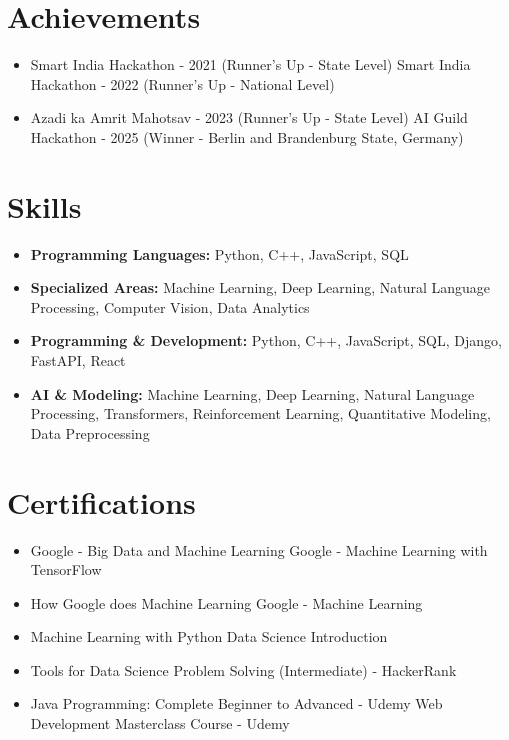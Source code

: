 \documentclass[a4paper,10pt]{article}
\begin{document}
\section*{Achievements}
\begin{itemize}
\item Smart India Hackathon - 2021 (Runner's Up - State Level) \hfill Smart India Hackathon - 2022 (Runner's Up - National Level)
\item Azadi ka Amrit Mahotsav - 2023 (Runner's Up - State Level) \hfill AI Guild Hackathon - 2025 (Winner - Berlin and Brandenburg State, Germany)
\end{itemize}

\section*{Skills}
\begin{itemize}
  \item \textbf{Programming Languages:} Python, C++, JavaScript, SQL
  \item \textbf{Specialized Areas:} Machine Learning, Deep Learning, Natural Language Processing, Computer Vision, Data Analytics
  \item \textbf{Programming \& Development:} Python, C++, JavaScript, SQL, Django, FastAPI, React
  \item \textbf{AI \& Modeling:} Machine Learning, Deep Learning, Natural Language Processing, Transformers, Reinforcement Learning, Quantitative Modeling, Data Preprocessing
\end{itemize}

\section*{Certifications}
\begin{itemize}
\item Google - Big Data and Machine Learning \hfill Google - Machine Learning with TensorFlow
\item How Google does Machine Learning \hfill Google - Machine Learning
\item Machine Learning with Python \hfill Data Science Introduction
\item Tools for Data Science \hfill Problem Solving (Intermediate) - HackerRank
\item Java Programming: Complete Beginner to Advanced - Udemy \hfill Web Development Masterclass Course - Udemy
\end{itemize}
\end{document}
